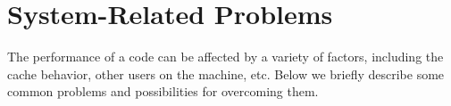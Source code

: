 {{\begin{itemize}
\end{itemize}

%
%
\section{System-Related Problems}

The performance of a code can be affected by a variety of factors, 
including the cache behavior, other users on the machine, etc.
Below we briefly describe some common problems and possibilities for
overcoming them.

}}
